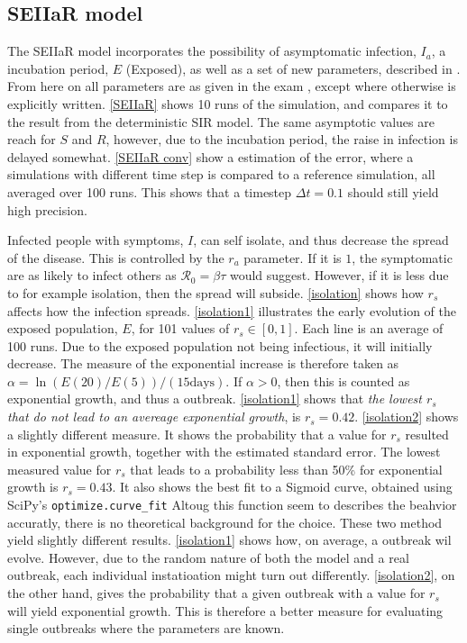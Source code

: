 \documentclass{article}
\begin{document}
    \subsection*{SEIIaR model}
    The SEIIaR model incorporates the possibility of asymptomatic infection, $I_a$, a incubation period, $E$ (Exposed), as well as a set of new parameters, described in \cite{exam}.
    From here on all parameters are as given in the exam \cite{exam}, except where otherwise is explicitly written.
    \autoref{SEIIaR} shows 10 runs of the simulation, and compares it to the result from the deterministic SIR model.
    The same asymptotic values are reach for $S$ and $R$, however, due to the incubation period, the raise in infection is delayed somewhat.
    \autoref{SEIIaR conv} show a estimation of the error, where a simulations with different time step is compared to a reference simulation, all averaged over 100 runs.
    This shows that a timestep $\Delta t = 0.1$ should still yield high precision.

    Infected people with symptoms, $I$, can self isolate, and thus decrease the spread of the disease.
    This is controlled by the $r_a$ parameter.
    If it is $1$, the symptomatic are as likely to infect others as $\mathcal{R}_0 = \beta \tau $ would suggest. 
    However, if it is less due to for example isolation, then the spread will subside.
    \autoref{isolation} shows how $r_s$ affects how the infection spreads.
    \autoref{isolation1} illustrates the early evolution of the exposed population, $E$, for 101 values of $r_s\in [0, 1]$.
    Each line is an average of 100 runs.
    Due to the exposed population not being infectious, it will initially decrease.
    The measure of the exponential increase is therefore taken as $\alpha = \ln\left(E(20)/E(5)\right)/(15 \mathrm{days})$.
    If $\alpha>0$, then this is counted as exponential growth, and thus a outbreak.
    \autoref{isolation1} shows that \emph{the lowest $r_s$ that do not lead to an avereage exponential growth}, is $r_s = 0.42$.
    \autoref{isolation2} shows a slightly different measure.
    It shows the probability that a value for $r_s$ resulted in exponential growth, together with the estimated standard error.
    The lowest measured value for $r_s$ that leads to a probability less than 50\% for exponential growth is $r_s = 0.43$.
    It also shows the best fit to a Sigmoid curve, obtained using SciPy's \verb|optimize.curve_fit|
    Altoug this function seem to describes the beahvior accuratly, there is no theoretical background for the choice.
    These two method yield slightly different results.
    \autoref{isolation1} shows how, on average, a outbreak wil evolve.
    However, due to the random nature of both the model and a real outbreak, each individual instatioation might turn out differently.
    \autoref{isolation2}, on the other hand, gives the probability that a given outbreak with a value for $r_s$ will yield exponential growth.
    This is therefore a better measure for evaluating single outbreaks where the parameters are known.
\end{document}
